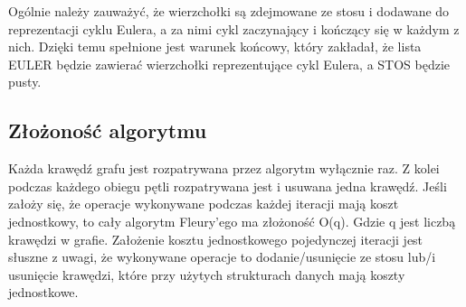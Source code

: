 Ogólnie należy zauważyć, że wierzchołki są zdejmowane ze stosu i dodawane do reprezentacji cyklu Eulera, a za nimi cykl zaczynający i kończący się w każdym z nich.
Dzięki temu spełnione jest warunek końcowy, który zakładał, że lista EULER będzie zawierać wierzchołki reprezentujące cykl Eulera, a STOS będzie pusty.

\subsection{Złożoność algorytmu}

Każda krawędź grafu jest rozpatrywana przez algorytm wyłącznie raz. Z kolei podczas każdego obiegu pętli rozpatrywana jest i usuwana jedna krawędź. 
Jeśli założy się, że operacje wykonywane podczas każdej iteracji mają koszt jednostkowy, to cały algorytm Fleury'ego ma złożoność O(q). Gdzie q jest liczbą krawędzi w grafie.
Założenie kosztu jednostkowego pojedynczej iteracji jest słuszne z uwagi, że wykonywane operacje to dodanie/usunięcie ze stosu lub/i usunięcie krawędzi, które przy użytych strukturach danych mają koszty jednostkowe.



